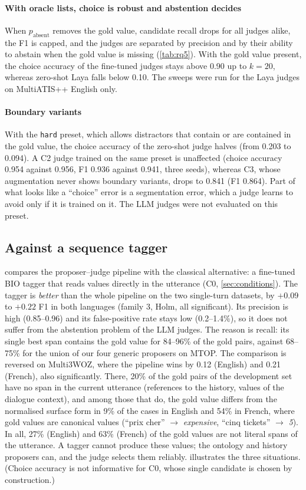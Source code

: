 \paragraph{With oracle lists, choice is robust and abstention decides} When $p_{\text{absent}}$ removes the gold value, candidate recall drops for all judges alike, the F1 is capped, and the judges are separated by precision and by their ability to abstain when the gold value is missing (\cref{tab:rq5}). With the gold value present, the choice accuracy of the fine-tuned judges stays above 0.90 up to $k=20$, whereas zero-shot Laya falls below 0.10. The sweeps were run for the Laya judges on MultiATIS++ English only.

\paragraph{Boundary variants} With the \texttt{hard} preset, which allows distractors that contain or are contained in the gold value, the choice accuracy of the zero-shot judge halves (from 0.203 to 0.094). A C2 judge trained on the same preset is unaffected (choice accuracy 0.954 against 0.956, F1 0.936 against 0.941, three seeds), whereas C3, whose augmentation never shows boundary variants, drops to 0.841 (F1 0.864). Part of what looks like a ``choice'' error is a segmentation error, which a judge learns to avoid only if it is trained on it. The LLM judges were not evaluated on this preset.

\subsection{Against a sequence tagger}
\label{sec:rq2-tagger}

 compares the proposer--judge pipeline with the classical alternative: a fine-tuned BIO tagger that reads values directly in the utterance (C0, \cref{sec:conditions}). The tagger is \emph{better} than the whole pipeline on the two single-turn datasets, by $+0.09$ to $+0.22$ F1 in both languages (family 3, Holm, all significant). Its precision is high (0.85--0.96) and its false-positive rate stays low (0.2--1.4\%), so it does not suffer from the abstention problem of the LLM judges. The reason is recall: its single best span contains the gold value for 84--96\% of the gold pairs, against 68--75\% for the union of our four generic proposers on MTOP. The comparison is reversed on Multi3WOZ, where the pipeline wins by 0.12 (English) and 0.21 (French), also significantly. There, 20\% of the gold pairs of the development set have no span in the current utterance (references to the history, values of the dialogue context), and among those that do, the gold value differs from the normalised surface form in 9\% of the cases in English and 54\% in French, where gold values are canonical values (``prix cher'' $\rightarrow$ \emph{expensive}, ``cinq tickets'' $\rightarrow$ \emph{5}). In all, 27\% (English) and 63\% (French) of the gold values are not literal spans of the utterance. A tagger cannot produce these values; the ontology and history proposers can, and the judge selects them reliably.  illustrates the three situations. (Choice accuracy is not informative for C0, whose single candidate is chosen by construction.)

